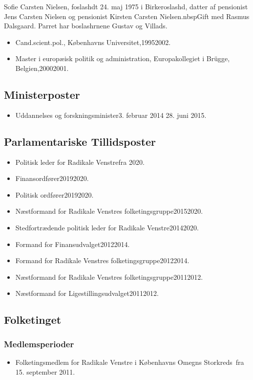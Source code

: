 \documentclass[11pt, a4paper]{awesome-cv}
\begin{document}
\makecvheader[R]
\makelettertitle
\begin{cvletter}
Sofie Carsten Nielsen, foslashdt 24. maj 1975 i Birkeroslashd, datter af pensionist Jens Carsten Nielsen og pensionist Kirsten Carsten Nielsen.nbspGift med Rasmus Dalsgaard. Parret har boslashrnene Gustav og Villads.

\begin{itemize}
\item Cand.scient.pol., Københavns Universitet,19952002.
\item Master i europæisk politik og administration, Europakollegiet i Brügge, Belgien,20002001.
\end{itemize}
\subsection*{Ministerposter}
\begin{itemize}
\item Uddannelses og forskningsminister3. februar 2014  28. juni 2015.
\end{itemize}
\subsection*{Parlamentariske Tillidsposter}
\begin{itemize}
\item Politisk leder for Radikale Venstrefra 2020.
\item Finansordfører20192020.
\item Politisk ordfører20192020.
\item Næstformand for Radikale Venstres folketingsgruppe20152020.
\item Stedfortrædende politisk leder for Radikale Venstre20142020.
\item Formand for Finansudvalget20122014.
\item Formand for Radikale Venstres folketingsgruppe20122014.
\item Næstformand for Radikale Venstres folketingsgruppe20112012.
\item Næstformand for Ligestillingsudvalget20112012.
\end{itemize}
\subsection*{Folketinget}
\subsubsection*{Medlemsperioder}
\begin{itemize}
\item Folketingsmedlem for Radikale Venstre i Københavns Omegns Storkreds fra 15. september 2011.
\end{itemize}

\end{cvletter}
\end{document}

